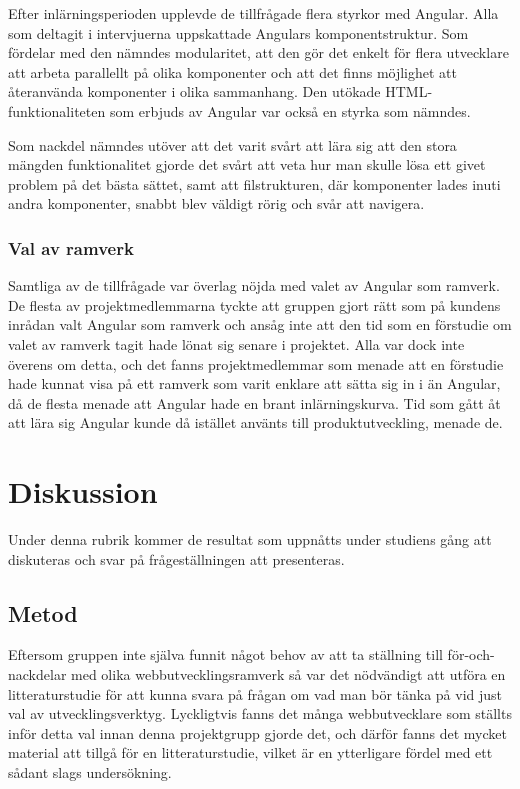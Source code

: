 Efter inlärningsperioden upplevde de tillfrågade flera styrkor med Angular. Alla som deltagit i intervjuerna uppskattade Angulars komponentstruktur. Som fördelar med den nämndes modularitet, att den gör det enkelt för flera utvecklare att arbeta parallellt på olika komponenter och att det finns möjlighet att återanvända komponenter i olika sammanhang. Den utökade HTML-funktionaliteten som erbjuds av Angular var också en styrka som nämndes.

Som nackdel nämndes utöver att det varit svårt att lära sig att den stora mängden funktionalitet gjorde det svårt att veta hur man skulle lösa ett givet problem på det bästa sättet, samt att filstrukturen, där komponenter lades inuti andra komponenter, snabbt blev väldigt rörig och svår att navigera.

\subsubsection{Val av ramverk}

Samtliga av de tillfrågade var överlag nöjda med valet av Angular som ramverk. De flesta av projektmedlemmarna tyckte att gruppen gjort rätt som på kundens inrådan valt Angular som ramverk och ansåg inte att den tid som en förstudie om valet av ramverk tagit hade lönat sig senare i projektet. Alla var dock inte överens om detta, och det fanns projektmedlemmar som menade att en förstudie hade kunnat visa på ett ramverk som varit enklare att sätta sig in i än Angular, då de flesta menade att Angular hade en brant inlärningskurva. Tid som gått åt att lära sig Angular kunde då istället använts till produktutveckling, menade de.   


\section{Diskussion}

Under denna rubrik kommer de resultat som uppnåtts under studiens gång att diskuteras och svar på frågeställningen att presenteras.

\subsection{Metod}

Eftersom gruppen inte själva funnit något behov av att ta ställning till för-och-nackdelar med olika webbutvecklingsramverk så var det nödvändigt att utföra en litteraturstudie för att kunna svara på frågan om vad man bör tänka på vid just val av utvecklingsverktyg. Lyckligtvis fanns det många webbutvecklare som ställts inför detta val innan denna projektgrupp gjorde det, och därför fanns det mycket material att tillgå för en litteraturstudie, vilket är en ytterligare fördel med ett sådant slags undersökning.

